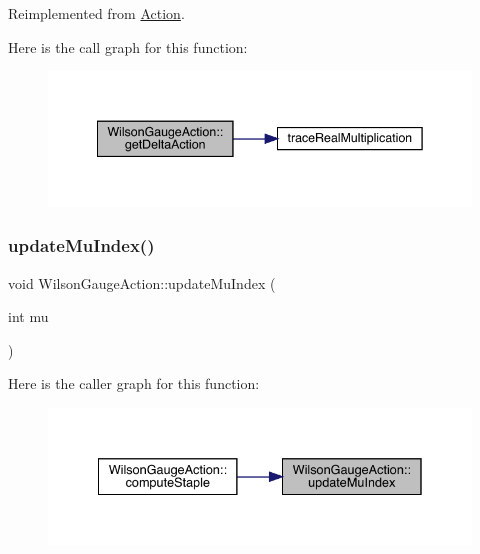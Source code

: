 Reimplemented from \mbox{\hyperlink{class_action_a9409aad86cbfe3b6ec25bf5a837eaea5}{Action}}.

Here is the call graph for this function\+:\nopagebreak
\begin{figure}[H]
\begin{center}
\leavevmode
\includegraphics[width=342pt]{class_wilson_gauge_action_a60f2892e61489004df3cde6cc856b00b_cgraph}
\end{center}
\end{figure}
\mbox{\label{class_wilson_gauge_action_ab7ed4ab8e475f5a188cd19ce720a5eb9}} 
\subsubsection{\texorpdfstring{updateMuIndex()}{updateMuIndex()}}
{\footnotesize\ttfamily void Wilson\+Gauge\+Action\+::update\+Mu\+Index (\begin{DoxyParamCaption}\item[{int}]{mu }\end{DoxyParamCaption})\hspace{0.3cm}{\ttfamily [inline]}}

Here is the caller graph for this function\+:\nopagebreak
\begin{figure}[H]
\begin{center}
\leavevmode
\includegraphics[width=335pt]{class_wilson_gauge_action_ab7ed4ab8e475f5a188cd19ce720a5eb9_icgraph}
\end{center}
\end{figure}
\mbox{\label{class_wilson_gauge_action_a010b3b8870476dfec4c48a01b6d6fc1d}} 
